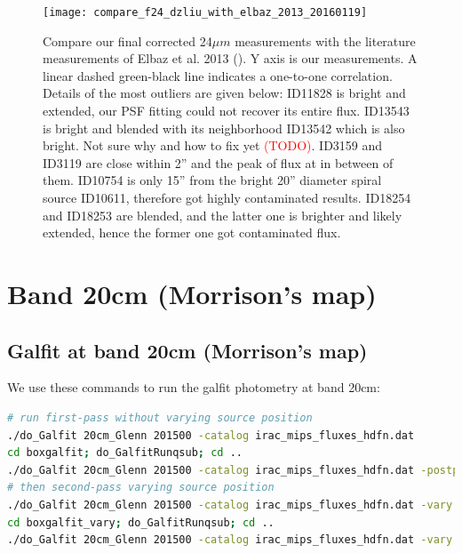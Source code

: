 \documentclass[11pt,a4paper]{article}
\begin{document}
\begin{figure}[H]
	\texttt{[image: compare\_f24\_dzliu\_with\_elbaz\_2013\_20160119]}
	\caption{Compare our final corrected 24${\mu}m$ measurements with the literature measurements of Elbaz et al. 2013 (). Y axis is our measurements. A linear dashed green-black line indicates a one-to-one correlation. Details of the most outliers are given below: ID11828 is bright and extended, our PSF fitting could not recover its entire flux. ID13543 is bright and blended with its neighborhood ID13542 which is also bright. Not sure why and how to fix yet \textcolor{red}{(TODO)}. ID3159 and ID3119 are close within 2'' and the peak of flux at in between of them. ID10754 is only 15'' from the bright 20'' diameter spiral source ID10611, therefore got highly contaminated results. ID18254 and ID18253 are blended, and the latter one is brighter and likely extended, hence the former one got contaminated flux.}
\end{figure}


\clearpage

\section{Band 20cm (Morrison's map)}

\subsection{Galfit at band 20cm (Morrison's map)}

We use these commands to run the galfit photometry at band 20cm:

\begin{lstlisting}[language=bash]
# run first-pass without varying source position
./do_Galfit 20cm_Glenn 201500 -catalog irac_mips_fluxes_hdfn.dat
cd boxgalfit; do_GalfitRunqsub; cd ..
./do_Galfit 20cm_Glenn 201500 -catalog irac_mips_fluxes_hdfn.dat -postparallel
# then second-pass varying source position
./do_Galfit 20cm_Glenn 201500 -catalog irac_mips_fluxes_hdfn.dat -vary
cd boxgalfit_vary; do_GalfitRunqsub; cd ..
./do_Galfit 20cm_Glenn 201500 -catalog irac_mips_fluxes_hdfn.dat -vary -postparallel
\end{lstlisting}
\end{document}
